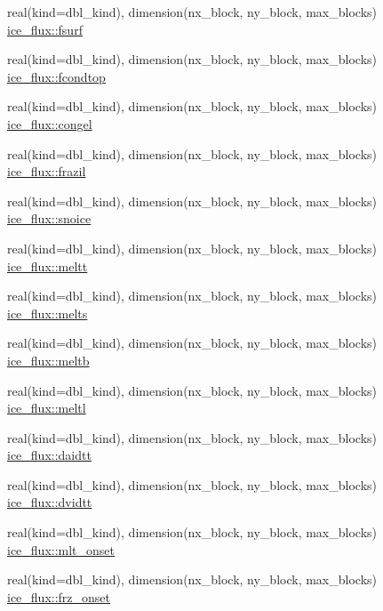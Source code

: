 \begin{DoxyCompactItemize}
\item 
real(kind=dbl\_\-kind), dimension(nx\_\-block, ny\_\-block, max\_\-blocks) \hyperlink{namespaceice__flux_a27dbd3d1fc36c0ddb4c39c806d935775}{ice\_\-flux::fsurf}
\item 
real(kind=dbl\_\-kind), dimension(nx\_\-block, ny\_\-block, max\_\-blocks) \hyperlink{namespaceice__flux_a0ba73c84e3792cf8704a33f6d95e7f95}{ice\_\-flux::fcondtop}
\item 
real(kind=dbl\_\-kind), dimension(nx\_\-block, ny\_\-block, max\_\-blocks) \hyperlink{namespaceice__flux_acb44c9e01061e258c35b8dbadf412741}{ice\_\-flux::congel}
\item 
real(kind=dbl\_\-kind), dimension(nx\_\-block, ny\_\-block, max\_\-blocks) \hyperlink{namespaceice__flux_a5e63c63db5a472f4041fc150316b8c67}{ice\_\-flux::frazil}
\item 
real(kind=dbl\_\-kind), dimension(nx\_\-block, ny\_\-block, max\_\-blocks) \hyperlink{namespaceice__flux_a081cc6f264496624fb6bce9e69e74d9c}{ice\_\-flux::snoice}
\item 
real(kind=dbl\_\-kind), dimension(nx\_\-block, ny\_\-block, max\_\-blocks) \hyperlink{namespaceice__flux_aa99daffd05f84f37a6036ce5901100af}{ice\_\-flux::meltt}
\item 
real(kind=dbl\_\-kind), dimension(nx\_\-block, ny\_\-block, max\_\-blocks) \hyperlink{namespaceice__flux_aae0e112fe38b436d979dc7fe86cdcb8f}{ice\_\-flux::melts}
\item 
real(kind=dbl\_\-kind), dimension(nx\_\-block, ny\_\-block, max\_\-blocks) \hyperlink{namespaceice__flux_acdba57f616cfb780f910b8214a5b6121}{ice\_\-flux::meltb}
\item 
real(kind=dbl\_\-kind), dimension(nx\_\-block, ny\_\-block, max\_\-blocks) \hyperlink{namespaceice__flux_a6aafbe05e11bff91bc937c605cf9d121}{ice\_\-flux::meltl}
\item 
real(kind=dbl\_\-kind), dimension(nx\_\-block, ny\_\-block, max\_\-blocks) \hyperlink{namespaceice__flux_aff988ec903f1e7908e7b8a176ea792ed}{ice\_\-flux::daidtt}
\item 
real(kind=dbl\_\-kind), dimension(nx\_\-block, ny\_\-block, max\_\-blocks) \hyperlink{namespaceice__flux_a7c8b98f21bf9431f5d2a10d6643f0752}{ice\_\-flux::dvidtt}
\item 
real(kind=dbl\_\-kind), dimension(nx\_\-block, ny\_\-block, max\_\-blocks) \hyperlink{namespaceice__flux_a9f86616260452938fcc37213fcb284f8}{ice\_\-flux::mlt\_\-onset}
\item 
real(kind=dbl\_\-kind), dimension(nx\_\-block, ny\_\-block, max\_\-blocks) \hyperlink{namespaceice__flux_aa58df919e95f30bf2b824e6585dbd9e5}{ice\_\-flux::frz\_\-onset}

\end{DoxyCompactItemize}
